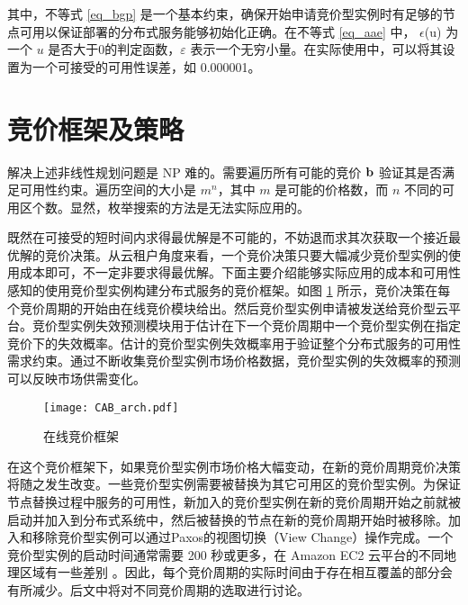 其中，不等式 \eqref{eq_bgp} 是一个基本约束，确保开始申请竞价型实例时有足够的节点可用以保证部署的分布式服务能够初始化正确。在不等式 \eqref{eq_aae} 中， $\epsilon$(u) 为一个 $u$ 是否大于0的判定函数，$\varepsilon$ 表示一个无穷小量。在实际使用中，可以将其设置为一个可接受的可用性误差，如 0.000001。

\section{竞价框架及策略}
\label{jupiter-framework}
解决上述非线性规划问题是 NP 难的。需要遍历所有可能的竞价 $\bf b$ 验证其是否满足可用性约束。遍历空间的大小是 $m^n$，其中 $m$ 是可能的价格数，而 $n$ 不同的可用区个数。显然，枚举搜索的方法是无法实际应用的。

既然在可接受的短时间内求得最优解是不可能的，不妨退而求其次获取一个接近最优解的竞价决策。从云租户角度来看，一个竞价决策只要大幅减少竞价型实例的使用成本即可，不一定非要求得最优解。下面主要介绍能够实际应用的成本和可用性感知的使用竞价型实例构建分布式服务的竞价框架。如图 \ref{figure:framework} 所示，竞价决策在每个竞价周期的开始由在线竞价模块给出。然后竞价型实例申请被发送给竞价型云平台。竞价型实例失效预测模块用于估计在下一个竞价周期中一个竞价型实例在指定竞价下的失效概率。估计的竞价型实例失效概率用于验证整个分布式服务的可用性需求约束。通过不断收集竞价型实例市场价格数据，竞价型实例的失效概率的预测可以反映市场供需变化。
\begin{figure}
  \centering
  \texttt{[image: CAB\_arch.pdf]}
  \caption{在线竞价框架}
  \label{figure:framework}
\end{figure}

在这个竞价框架下，如果竞价型实例市场价格大幅变动，在新的竞价周期竞价决策将随之发生改变。一些竞价型实例需要被替换为其它可用区的竞价型实例。为保证节点替换过程中服务的可用性，新加入的竞价型实例在新的竞价周期开始之前就被启动并加入到分布式系统中，然后被替换的节点在新的竞价周期开始时被移除。加入和移除竞价型实例可以通过Paxos的视图切换（View Change）操作完成。一个竞价型实例的启动时间通常需要 200 秒或更多，在 Amazon EC2 云平台的不同地理区域有一些差别 \cite{Mao:2012:PSV:2353730.2353859}。因此，每个竞价周期的实际时间由于存在相互覆盖的部分会有所减少。后文中将对不同竞价周期的选取进行讨论。

